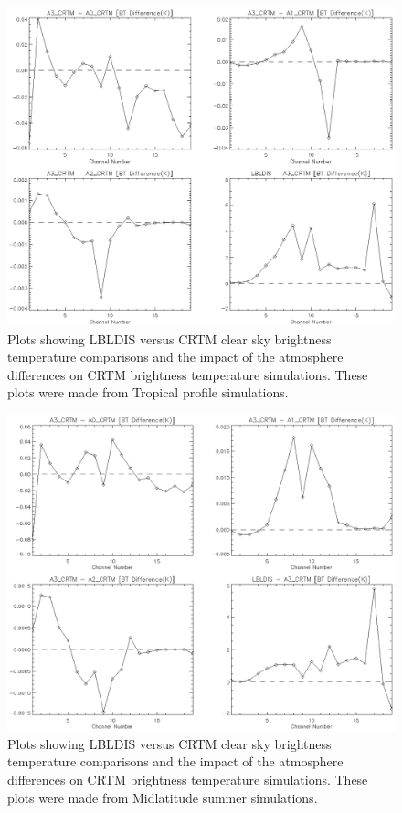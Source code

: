 
\begin{figure}[htp]
  \centering{}
  \includegraphics[scale=0.8]{./graphics/BT_Differences_08.eps}
  \caption{Plots showing LBLDIS versus CRTM clear sky brightness temperature comparisons and the
  impact of the atmosphere differences on CRTM brightness temperature simulations. These plots were 
  made from Tropical profile simulations.}
  \label{fig:BT_Differences_Tropical}
\end{figure}

\begin{figure}[htp]
  \centering{}
  \includegraphics[scale=0.8]{./graphics/BT_Differences_01.eps}
  \caption{Plots showing LBLDIS versus CRTM clear sky brightness temperature comparisons and the
  impact of the atmosphere differences on CRTM brightness temperature simulations. These plots were 
  made from Midlatitude summer simulations.}
  \label{fig:BT_Differences_Midlatitude_summer}
\end{figure}

